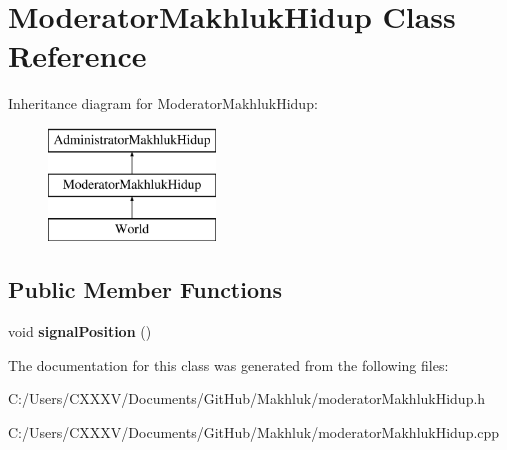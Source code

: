 \hypertarget{class_moderator_makhluk_hidup}{}\section{Moderator\+Makhluk\+Hidup Class Reference}
\label{class_moderator_makhluk_hidup}
Inheritance diagram for Moderator\+Makhluk\+Hidup\+:\begin{figure}[H]
\begin{center}
\leavevmode
\includegraphics[height=3.000000cm]{class_moderator_makhluk_hidup}
\end{center}
\end{figure}
\subsection*{Public Member Functions}
\begin{DoxyCompactItemize}
\item 
void {\bfseries signal\+Position} ()\hypertarget{class_moderator_makhluk_hidup_ab230361c7f172ca30d8304cc5bf80ebf}{}\label{class_moderator_makhluk_hidup_ab230361c7f172ca30d8304cc5bf80ebf}

\end{DoxyCompactItemize}


The documentation for this class was generated from the following files\+:\begin{DoxyCompactItemize}
\item 
C\+:/\+Users/\+C\+X\+X\+X\+V/\+Documents/\+Git\+Hub/\+Makhluk/moderator\+Makhluk\+Hidup.\+h\item 
C\+:/\+Users/\+C\+X\+X\+X\+V/\+Documents/\+Git\+Hub/\+Makhluk/moderator\+Makhluk\+Hidup.\+cpp\end{DoxyCompactItemize}
